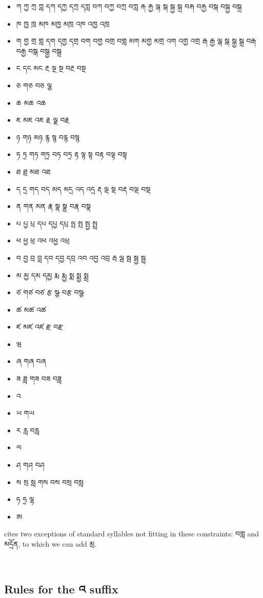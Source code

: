 \documentclass[%
a4paper,%
pagesize,%
12pt,%
parskip=off,%
bibliography=totoc,%
numbers=noenddot,%
DIV=12,%
twoside=semi,%
headings=normal%
]{scrartcl}
\begin{document}
\begin{itemize}
\item ཀ ཀྱ ཀྲ ཀླ དཀ དཀྱ དཀྲ དཀླ བཀ བཀྱ བཀྲ བཀླ རྐ རྐྱ ལྐ སྐ སྐྱ སྐྲ བརྐ བརྐྱ བསྐ བསྐྱ བསྐྲ
\item ཁ ཁྱ ཁྲ མཁ མཁྱ མཁྲ འཁ འཁྱ འཁྲ
\item ག གྱ གྲ གླ དག དགྱ དགྲ བག བགྱ བགྲ བགླ མག མགྱ མགྲ འག འགྱ འགྲ རྒ རྒྱ ལྒ སྒ སྒྱ སྒྲ བརྒ བརྒྱ བསྒ བསྒྱ བསྒྲ
\item ང དང མང རྔ ལྔ སྔ བརྔ བསྔ
\item ཅ གཅ བཅ ལྕ
\item ཆ མཆ འཆ
\item ཇ མཇ འཇ རྗ ལྗ བརྗ
\item ཉ གཉ མཉ རྙ སྙ བརྙ བསྙ
\item ཏ ཏྲ གཏ གཏྲ བཏ བཏྲ རྟ ལྟ སྟ བརྟ བལྟ བསྟ
\item ཐ ཐྲ མཐ འཐ
\item ད དྲ གད བད མད མདྲ འད འདྲ རྡ ལྡ སྡ བརྡ བལྡ བསྡ
\item ན གན མན རྣ སྣ སྣྲ བརྣ བསྣ
\item པ པྱ པྲ དཔ དཔྱ དཔྲ ལྤ སྤ སྤྱ སྤྲ
\item ཕ ཕྱ ཕྲ འཕ འཕྱ འཕྲ
\item བ བྱ བྲ བླ དབ དབྱ དབྲ འབ འབྱ འབྲ རྦ ལྦ སྦ སྦྱ སྦྲ
\item མ མྱ དམ དམྱ རྨ རྨྱ སྨ སྨྱ སྨྲ
\item ཙ གཙ བཙ རྩ སྩ བརྩ བསྩ
\item ཚ མཚ འཚ
\item ཛ མཛ འཛ རྫ བརྫ
\item ཝ
\item ཞ གཞ བཞ
\item ཟ ཟླ གཟ བཟ བཟླ
\item འ
\item ཡ གཡ
\item ར རླ བརླ
\item ལ
\item ཤ གཤ བཤ
\item ས སྲ སླ གས བས བསྲ བསླ
\item ཧ ཧྲ ལྷ
\item ཨ
\end{itemize}

\cite{TsheshabGrammarTopics} cites two exceptions of standard syllables not fitting in these constraints: བགླ and མདྲོན, to which we can add མྲ.

­\subsection{Rules for the འ suffix}
\end{document}
